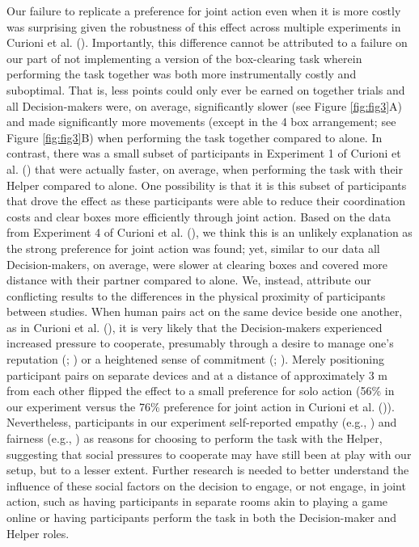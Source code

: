 \documentclass[
  man,
  floatsintext,
  longtable,
  nolmodern,
  notxfonts,
  notimes,
  mask,
  colorlinks=true,linkcolor=blue,citecolor=blue,urlcolor=blue]{apa7}
\begin{document}
Our failure to replicate a preference for joint action even when it is
more costly was surprising given the robustness of this effect across
multiple experiments in Curioni et al.
(). Importantly, this difference cannot
be attributed to a failure on our part of not implementing a version of
the box-clearing task wherein performing the task together was both more
instrumentally costly and suboptimal. That is, less points could only
ever be earned on together trials and all Decision-makers were, on
average, significantly slower (see Figure \ref{fig:fig3}A) and made
significantly more movements (except in the 4 box arrangement; see
Figure \ref{fig:fig3}B) when performing the task together compared to
alone. In contrast, there was a small subset of participants in
Experiment 1 of Curioni et al. () that
were actually faster, on average, when performing the task with their
Helper compared to alone. One possibility is that it is this subset of
participants that drove the effect as these participants were able to
reduce their coordination costs and clear boxes more efficiently through
joint action. Based on the data from Experiment 4 of Curioni et al.
(), we think this is an unlikely
explanation as the strong preference for joint action was found; yet,
similar to our data all Decision-makers, on average, were slower at
clearing boxes and covered more distance with their partner compared to
alone. We, instead, attribute our conflicting results to the differences
in the physical proximity of participants between studies. When human
pairs act on the same device beside one another, as in Curioni et al.
(), it is very likely that the
Decision-makers experienced increased pressure to cooperate, presumably
through a desire to manage one's reputation
(;
) or a heightened sense of
commitment (;
). Merely positioning
participant pairs on separate devices and at a distance of approximately
3 m from each other flipped the effect to a small preference for solo
action (56\% in our experiment versus the 76\% preference for joint
action in Curioni et al. ()).
Nevertheless, participants in our experiment self-reported empathy
(e.g., ) and fairness
(e.g., ) as reasons
for choosing to perform the task with the Helper, suggesting that social
pressures to cooperate may have still been at play with our setup, but
to a lesser extent. Further research is needed to better understand the
influence of these social factors on the decision to engage, or not
engage, in joint action, such as having participants in separate rooms
akin to playing a game online or having participants perform the task in
both the Decision-maker and Helper roles.
\end{document}
